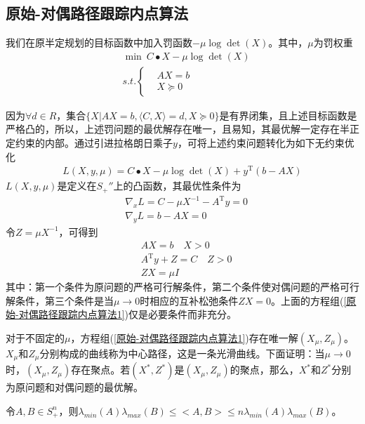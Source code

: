     \subsection{原始-对偶路径跟踪内点算法}
        \par
        我们在原半定规划的目标函数中加入罚函数$-\mu {\log} \det(X)$。其中，$\mu$为罚权重
        \begin{align*}
          & \mathop{\min} \ C\bullet X-\mu {\log} \det(X)\\
          & s.t.\left\{
          \begin{aligned}
          & AX=b\\
          & X \succeq 0
          \end{aligned}
          \right.
        \end{align*}
        \par
        因为$\forall d \in R$，集合$\{X|AX=b,\langle{C, X}\rangle=d,X\succeq 0\}$是有界闭集，且上述目标函数是严格凸的，所以，上述罚问题的最优解存在唯一，且易知，其最优解一定存在半正定约束的内部。通过引进拉格朗日乘子$y$，可将上述约束问题转化为如下无约束优化
        \begin{align*}
          L(X,y,\mu)=C\bullet X-\mu {\log}\det(X)+y^\mathrm{T} (b-AX)
        \end{align*}
        $L(X,y,\mu)$是定义在$S_{+}''$上的凸函数，其最优性条件为
        \begin{align*}
          & {\nabla}_xL=C -\mu X^{-1}-A^\mathrm{T} y=0\\
          & {\nabla}_yL=b -A X=0
        \end{align*}
        令$Z =\mu X^{-1}$，可得到
        \begin{align}
        \label{原始-对偶路径跟踪内点算法1}
          & AX=b\quad X>0\\
          & A^\mathrm{T} y+Z=C\quad Z>0\\
          & ZX=\mu I
        \end{align}
        其中：第一个条件为原问题的严格可行解条件，第二个条件使对偶问题的严格可行解条件，第三个条件是当$\mu\to 0$时相应的互补松弛条件$ZX=0$。上面的方程组(\ref{原始-对偶路径跟踪内点算法1})仅是必要条件而非充分。
        \par
        对于不固定的$\mu$，方程组(\ref{原始-对偶路径跟踪内点算法1})存在唯一解$(X_{\mu},Z_{\mu})$。$X_{\mu}$和$Z_{\mu}$分别构成的曲线称为中心路径，这是一条光滑曲线。下面证明：当$\mu \to 0$时，$(X_{\mu},Z_{\mu})$存在聚点。若$(X^*,Z^*)$是$(X_{\mu},Z_{\mu})$的聚点，那么，$X^*$和$Z^*$分别为原问题和对偶问题的最优解。
        \begin{lemma}
                令$A,B\in S_{+}^n$，则${\lambda}_{min}(A){\lambda}_{max}(B)\leqslant \big<{A,B}\big>\leqslant n{\lambda}_{min}(A){\lambda}_{max}(B)$。
        \end{lemma}
